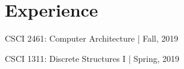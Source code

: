 \documentclass[]{deedy-resume-openfont}
\begin{document}
\begin{minipage}[t]{0.66\textwidth}

        \section{Experience}
        \vspace{\topsep} %
        \begin{tightemize} 
                \item CSCI 2461: Computer Architecture | Fall, 2019
                \item CSCI 1311: Discrete Structures I | Spring, 2019
        \end{tightemize}
        \sectionsep

        \sectionsep



\end{minipage}
\end{document}
